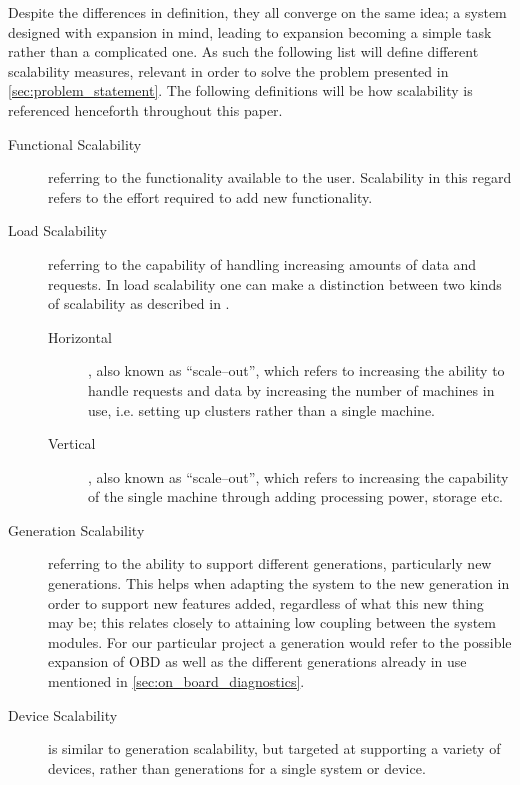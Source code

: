 Despite the differences in definition, they all converge on the same idea; a system designed with expansion in mind, leading to expansion becoming a simple task rather than a complicated one.
As such the following list will define different scalability measures, relevant in order to solve the problem presented in \cref{sec:problem_statement}.
The following definitions will be how scalability is referenced henceforth throughout this paper.
\begin{description}
    \item [Functional Scalability]
        referring to the functionality available to the user.
        Scalability in this regard refers to the effort required to add new functionality.
    \item [Load Scalability]
        referring to the capability of handling increasing amounts of data and requests.
        In load scalability one can make a distinction between two kinds of scalability as described in \cite{HoriVertScale}.
        \begin{description}
            \item [Horizontal], also known as ``scale--out'', which refers to increasing the ability to handle requests and data by increasing the number of machines in use, i.e. setting up clusters rather than a single machine.
            \item [Vertical], also known as ``scale--out'', which refers to increasing the capability of the single machine through adding processing power, storage etc.
        \end{description}
    \item [Generation Scalability]
        referring to the ability to support different generations, particularly new generations.
        This helps when adapting the system to the new generation in order to support new features added, regardless of what this new thing may be; this relates closely to attaining low coupling between the system modules.
        For our particular project a generation would refer to the possible expansion of \ac{OBD} as well as the different generations already in use mentioned in \cref{sec:on_board_diagnostics}.
    \item [Device Scalability]
        is similar to generation scalability, but targeted at supporting a variety of devices, rather than generations for a single system or device.
\end{description}
